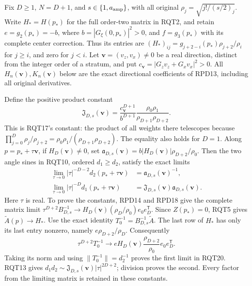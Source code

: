 \documentclass[11pt]{article}
\begin{document}
Fix $D\ge1$, $N=D+1$, and $s\in\{1,a_{\rm amp}\}$, with all
original $\rho_j=\sqrt{j!/(s/2)_j}$.  Write $H_*=H(p_*)$ for the
full order-two matrix in RQT2, and retain $e=g_2(p_*)=-b$, where
$b=|G_\xi(0,p_*)|^2>0$, and $f=g_3(p_*)$ with its complete center
correction.  Thus its entries are
$(H_*)_{ij}=g_{j+2-i}(p_*)\rho_{j+2}/\rho_i$ for $j\ge i$,
and zero for $j<i$.  Let $\mathbf v=(v_z,v_x)\ne0$ be a real
direction, distinct from the integer order of a stratum, and put
$c_{\mathbf v}=|G_zv_z+G_xv_x|^2>0$.
All $H_n(\mathbf v),K_n(\mathbf v)$ below are the exact directional
coefficients of RPD13, including all original derivatives.

Define the positive product constant
\[
 \mathfrak J_{D,s}(\mathbf v)
 =\frac{c_{\mathbf v}^{D+1}}{b^{D+1}}
       \frac{\rho_0\rho_1}{\rho_{D+1}\rho_{D+2}}.
\]
This is RQT17's constant: the product of all weights there telescopes
because
$\prod_{j=0}^D\rho_j/\rho_{j+2}
 =\rho_0\rho_1/(\rho_{D+1}\rho_{D+2})$.
The equality also holds for $D=1$.
Along $p=p_*+\tau\mathbf v$, if $H_D(\mathbf v)\ne0$, set
$\mathfrak a_{D,s}(\mathbf v)=
b|H_D(\mathbf v)|\rho_{D+2}/\rho_0$.
Then the two angle sines in RQT10, ordered $d_1\ge d_2$, satisfy
the exact limits
\[
 \begin{aligned}
 \lim_{\tau\to0}|\tau|^{-D-2}d_2(p_*+\tau\mathbf v)
   &=\mathfrak a_{D,s}(\mathbf v)^{-1},\\
 \lim_{\tau\to0}|\tau|^{-D}d_1(p_*+\tau\mathbf v)
   &=\mathfrak J_{D,s}(\mathbf v)\mathfrak a_{D,s}(\mathbf v).
 \end{aligned}\tag{RQT20}
\]
Here $\tau$ is real.  To prove the constants, RPD14 and RPD18 give
the complete matrix limit
$\tau^{D+2}B_{D,s}^{-1}\to
H_D(\mathbf v)(\rho_D/\rho_0)e_0e_D^{\mathsf T}$.
Since $Z(p_*)=0$, RQT5 gives
$\widetilde A(p)\to H_*$.
Use the exact identity $T_0^{-1}=B_{D,s}^{-1}\widetilde A$.
The last row of $H_*$ has only its last entry nonzero, namely
$e\rho_{D+2}/\rho_D$.  Consequently
\[
 \tau^{D+2}T_0^{-1}\longrightarrow
 eH_D(\mathbf v)\frac{\rho_{D+2}}{\rho_0}
                           e_0e_D^{\mathsf T}.
\]
Taking its norm and using $\|T_0^{-1}\|=d_2^{-1}$ proves the
first limit in RQT20.  RQT13 gives
$d_1d_2\sim\mathfrak J_{D,s}(\mathbf v)|\tau|^{2D+2}$;
division proves the second.  Every factor from the limiting matrix
is retained in these constants.
\end{document}
